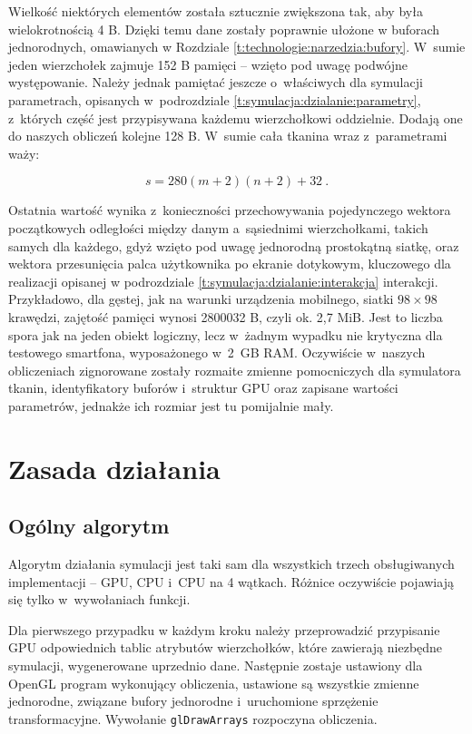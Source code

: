 	Wielkość niektórych elementów została sztucznie zwiększona tak, aby była wielokrotnością 4 B. Dzięki temu dane zostały poprawnie ułożone w buforach jednorodnych, omawianych w Rozdziale \ref{t:technologie:narzedzia:bufory}. W~sumie jeden wierzchołek zajmuje 152 B pamięci -- wzięto pod uwagę podwójne występowanie. Należy jednak pamiętać jeszcze o~właściwych dla symulacji parametrach, opisanych w~podrozdziale \ref{t:symulacja:dzialanie:parametry}, z~których część jest przypisywana każdemu wierzchołkowi oddzielnie. Dodają one do naszych obliczeń kolejne 128 B. W~sumie cała tkanina wraz z~parametrami waży:
	
	\begin{equation}
	s = 280(m + 2)(n + 2) + 32 \ .
	\end{equation} 
	
	Ostatnia wartość wynika z~konieczności przechowywania pojedynczego wektora początkowych odległości między danym a~sąsiednimi wierzchołkami, takich samych dla każdego, gdyż wzięto pod uwagę jednorodną prostokątną siatkę, oraz wektora przesunięcia palca użytkownika po ekranie dotykowym, kluczowego dla realizacji opisanej w podrozdziale \ref{t:symulacja:dzialanie:interakcja} interakcji. Przykładowo, dla gęstej, jak na warunki urządzenia mobilnego, siatki \( 98 \times 98 \) krawędzi, zajętość pamięci wynosi 2800032 B, czyli ok. 2,7 MiB. Jest to liczba spora jak na jeden obiekt logiczny, lecz w~żadnym wypadku nie krytyczna dla testowego smartfona, wyposażonego w~2~GB RAM. Oczywiście w~naszych obliczeniach zignorowane zostały rozmaite zmienne pomocniczych dla symulatora tkanin, identyfikatory buforów i~struktur GPU oraz zapisane wartości parametrów, jednakże ich rozmiar jest tu pomijalnie mały.
	
	\section{Zasada działania}
	\label{t:symulacja:dzialanie}
	
		\subsection{Ogólny algorytm}
		\label{t:symulacja:dzialanie:algorytm}
		
		Algorytm działania symulacji jest taki sam dla wszystkich trzech obsługiwanych implementacji -- GPU, CPU i~CPU na 4 wątkach. Różnice oczywiście pojawiają się tylko w~wywołaniach funkcji. 
		
		Dla pierwszego przypadku w każdym kroku należy przeprowadzić przypisanie GPU odpowiednich tablic atrybutów wierzchołków, które zawierają niezbędne symulacji, wygenerowane uprzednio dane. Następnie zostaje ustawiony dla OpenGL program wykonujący obliczenia, ustawione są wszystkie zmienne jednorodne, związane bufory jednorodne i~uruchomione sprzężenie transformacyjne. Wywołanie \texttt{glDrawArrays} rozpoczyna obliczenia. 
		
